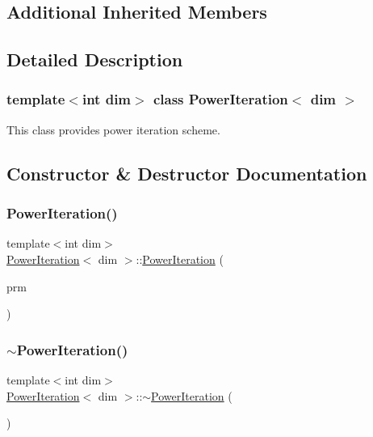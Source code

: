 \subsection*{Additional Inherited Members}


\subsection{Detailed Description}
\subsubsection*{template$<$int dim$>$\newline
class Power\+Iteration$<$ dim $>$}

This class provides power iteration scheme. 

\subsection{Constructor \& Destructor Documentation}
\mbox{\label{class_power_iteration_a2608445223ce7d27b24be0f9d7042554}} 
\subsubsection{\texorpdfstring{Power\+Iteration()}{PowerIteration()}}
{\footnotesize\ttfamily template$<$int dim$>$ \\
\hyperlink{class_power_iteration}{Power\+Iteration}$<$ dim $>$\+::\hyperlink{class_power_iteration}{Power\+Iteration} (\begin{DoxyParamCaption}\item[{const Parameter\+Handler \&}]{prm }\end{DoxyParamCaption})}

\mbox{\label{class_power_iteration_ad660a351afc4f23b1bcf7b334ef033dd}} 
\subsubsection{\texorpdfstring{$\sim$\+Power\+Iteration()}{~PowerIteration()}}
{\footnotesize\ttfamily template$<$int dim$>$ \\
\hyperlink{class_power_iteration}{Power\+Iteration}$<$ dim $>$\+::$\sim$\hyperlink{class_power_iteration}{Power\+Iteration} (\begin{DoxyParamCaption}{ }\end{DoxyParamCaption})}



